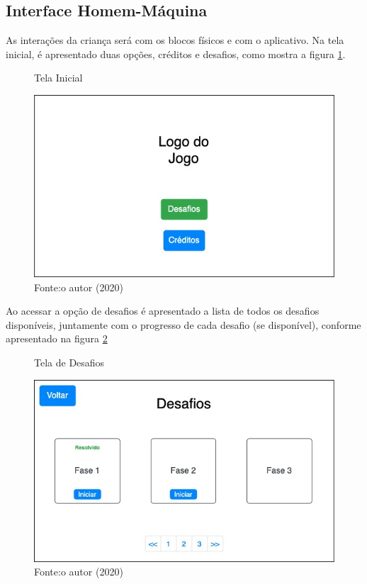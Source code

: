     \subsection{Interface Homem-Máquina}
    As interações da criança será com os blocos físicos e com o aplicativo.
    Na tela inicial, é apresentado duas opções, créditos e desafios, como mostra a figura \ref{figura:tela_inicial}.
    
    \begin{figure}[h!]
        \centering
        \caption{Tela Inicial}
        \includegraphics[width=12cm]{images/cap3/Tela Inicial.jpg}
        \caption*{Fonte:o autor (2020)}
        \label{figura:tela_inicial}
    \end{figure}
    
    Ao acessar a opção de desafios é apresentado a lista de todos os desafios disponíveis, juntamente com o progresso de cada desafio (se disponível), conforme apresentado na figura \ref{figura:tela_desafios}
    
    \begin{figure}[h!]
        \centering
        \caption{Tela de Desafios}
        \includegraphics[width=12cm]{images/cap3/tela_desafios.jpg}
        \caption*{Fonte:o autor (2020)}
        \label{figura:tela_desafios}
    \end{figure}
    
